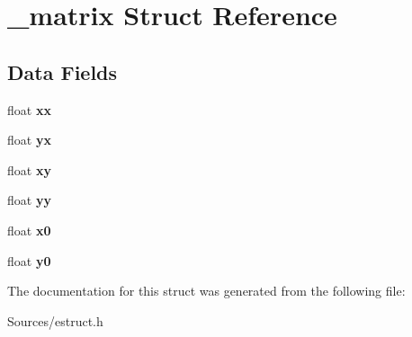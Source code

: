 \hypertarget{struct__matrix}{\section{\-\_\-matrix Struct Reference}
\label{struct__matrix}
}
\subsection*{Data Fields}
\begin{DoxyCompactItemize}
\item 
\hypertarget{struct__matrix_a9fb9d00fbbf390e0263bcc204b03c7c8}{float {\bfseries xx}}\label{struct__matrix_a9fb9d00fbbf390e0263bcc204b03c7c8}

\item 
\hypertarget{struct__matrix_a8e1608facba0c31efe99d65811fab570}{float {\bfseries yx}}\label{struct__matrix_a8e1608facba0c31efe99d65811fab570}

\item 
\hypertarget{struct__matrix_a83a7590defc35766f789fbbf7fc41590}{float {\bfseries xy}}\label{struct__matrix_a83a7590defc35766f789fbbf7fc41590}

\item 
\hypertarget{struct__matrix_a342cbf7f29a65a0d1a2949ef4675008e}{float {\bfseries yy}}\label{struct__matrix_a342cbf7f29a65a0d1a2949ef4675008e}

\item 
\hypertarget{struct__matrix_a3c9556645d92e863376a4063a3ad7001}{float {\bfseries x0}}\label{struct__matrix_a3c9556645d92e863376a4063a3ad7001}

\item 
\hypertarget{struct__matrix_adf19b8ba42d497d3093c3a51b1a32cca}{float {\bfseries y0}}\label{struct__matrix_adf19b8ba42d497d3093c3a51b1a32cca}

\end{DoxyCompactItemize}


The documentation for this struct was generated from the following file\-:\begin{DoxyCompactItemize}
\item 
Sources/estruct.\-h\end{DoxyCompactItemize}
